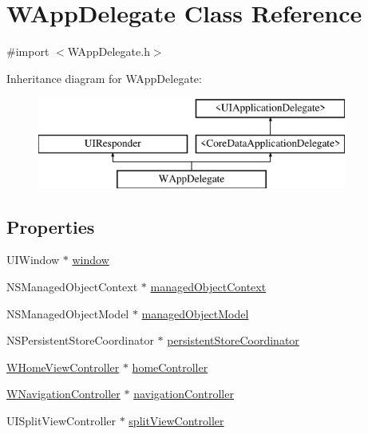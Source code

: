 \hypertarget{interface_w_app_delegate}{\section{W\-App\-Delegate Class Reference}
\label{interface_w_app_delegate}
}


{\ttfamily \#import $<$W\-App\-Delegate.\-h$>$}

Inheritance diagram for W\-App\-Delegate\-:\begin{figure}[H]
\begin{center}
\leavevmode
\includegraphics[height=3.000000cm]{interface_w_app_delegate}
\end{center}
\end{figure}
\subsection*{Properties}
\begin{DoxyCompactItemize}
\item 
U\-I\-Window $\ast$ \hyperlink{interface_w_app_delegate_a1e6aa1bbff255b3ef5a285cb2c43bc46}{window}
\item 
N\-S\-Managed\-Object\-Context $\ast$ \hyperlink{interface_w_app_delegate_afca885ae92186f927a18cb3b96b89d74}{managed\-Object\-Context}
\item 
N\-S\-Managed\-Object\-Model $\ast$ \hyperlink{interface_w_app_delegate_a3493bad40022edfb70dbb32c316d0607}{managed\-Object\-Model}
\item 
N\-S\-Persistent\-Store\-Coordinator $\ast$ \hyperlink{interface_w_app_delegate_a4c5493acae85106275b50c5e4a1d0127}{persistent\-Store\-Coordinator}
\item 
\hyperlink{interface_w_home_view_controller}{W\-Home\-View\-Controller} $\ast$ \hyperlink{interface_w_app_delegate_abf36af1cbff7bc7efe6a1d4657b409ea}{home\-Controller}
\item 
\hyperlink{interface_w_navigation_controller}{W\-Navigation\-Controller} $\ast$ \hyperlink{interface_w_app_delegate_ad0c4d65d6a08f4445cbcb49384b881c7}{navigation\-Controller}
\item 
U\-I\-Split\-View\-Controller $\ast$ \hyperlink{interface_w_app_delegate_abaf94e45f3650314c04b169d10892408}{split\-View\-Controller}
\end{DoxyCompactItemize}
